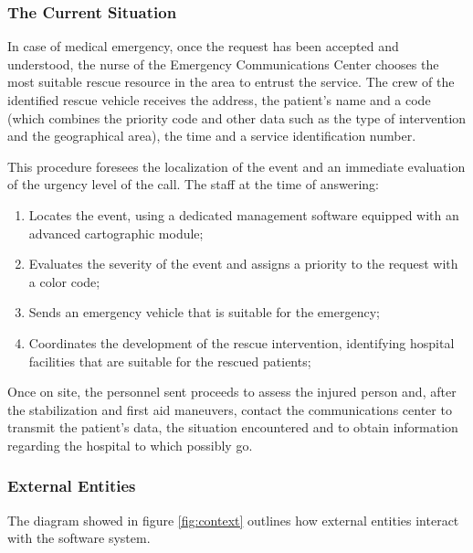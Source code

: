 \documentclass[11pt,a4paper]{article}
\begin{document}
\subsubsection{The Current Situation}
In case of medical emergency, once the request has been accepted and understood, the nurse of the Emergency Communications Center chooses the most suitable rescue resource in the area to entrust the service. 
%
The crew of the identified rescue vehicle receives the address, the patient's name and a code (which combines the priority code and other data such as the type of intervention and the geographical area), the time and a service identification number.

This procedure foresees the localization of the event and an immediate evaluation of the urgency level of the call. 
%
The staff at the time of answering: 

\begin{enumerate}
    \item Locates the event, using a dedicated management software equipped with an advanced cartographic module;
    \item Evaluates the severity of the event and assigns a priority to the request with a color code;
    \item Sends an emergency vehicle that is suitable for the emergency;
    \item Coordinates the development of the rescue intervention, identifying hospital facilities that are suitable for the rescued patients;
\end{enumerate}

Once on site, the personnel sent proceeds to assess the injured person and, after the stabilization and first aid maneuvers, contact the communications center to transmit the patient's data, the situation encountered and to obtain information regarding the hospital to which possibly go.

\subsubsection{External Entities}
The diagram showed in figure \ref{fig:context} outlines how external entities interact with the software system.
\end{document}
